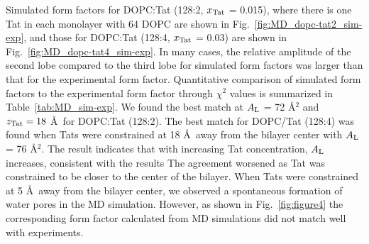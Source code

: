 Simulated form factors for DOPC:Tat (128:2, $x_\textrm{Tat}$ = 0.015),
where there is one Tat in each monolayer with 64 DOPC are shown in 
Fig.~\ref{fig:MD_dopc-tat2_sim-exp}, and 
those for DOPC:Tat (128:4, $x_\textrm{Tat}$ = 0.03) are shown in 
Fig.~\ref{fig:MD_dopc-tat4_sim-exp}.
In many cases, the relative amplitude of the second lobe compared to the 
third lobe for simulated form factors was larger than that for the experimental
form factor. Quantitative comparison of simulated form 
factors to the experimental form factor through $\chi^2$ values is summarized in 
Table~\ref{tab:MD_sim-exp}. We found the best match
at $A_\textrm{L}$ = 72 \AA$^2$ and $z_\textrm{Tat} = 18$ \AA\ for DOPC:Tat (128:2).
The best match for DOPC/Tat (128:4) was found when Tats were 
constrained at 18 \AA\ away from the bilayer center with $A_\textrm{L}$ = 76 \AA$^2$.
The result indicates that with increasing Tat concentration, $A_\textrm{L}$ increases,
consistent with the results
The agreement worsened as Tat was constrained to be closer to the
center of the bilayer.
When Tats were constrained at 5 \AA\ away from the bilayer center, we
observed a spontaneous formation of water pores in the MD simulation. However, 
as shown in Fig.~\ref{fig:figure4} the corresponding form factor calculated 
from MD simulations did not match well with experiments.

